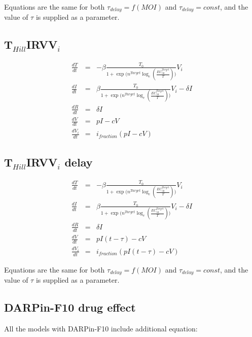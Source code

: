 Equations are the same for both $\tau_{delay} = f(MOI)$ and $\tau_{delay} = const$, and the value of $\tau$ is supplied as a parameter.

\subsection{T$_{Hill}$IRVV$_i$}

\begin{equation}
\begin{array}{rcl}
\frac{dT}{dt} &=& - \beta \frac{T_0}{1+\exp \big(n^{Target}\log_e(\frac{EC_{50}^{Target}}{T})\big)} V_i \\
\frac{dI}{dt} &=&  \beta \frac{T_0}{1+\exp \big(n^{Target}\log_e(\frac{EC_{50}^{Target}}{T})\big)} V_i - \delta I \\
\frac{dR}{dt} &=& \delta I \\
\frac{dV}{dt} &=& p I - c V\\
\frac{dV_i}{dt} &=& i_{fraction} (p I - c V)
\end{array}
\end{equation}

\subsection{T$_{Hill}$IRVV$_i$ delay}

\begin{equation}
\begin{array}{rcl}
\frac{dT}{dt} &=& - \beta \frac{T_0}{1+\exp \big(n^{Target}\log_e(\frac{EC_{50}^{Target}}{T})\big)} V_i \\
\frac{dI}{dt} &=&  \beta \frac{T_0}{1+\exp \big(n^{Target}\log_e(\frac{EC_{50}^{Target}}{T})\big)} V_i - \delta I \\
\frac{dR}{dt} &=& \delta I \\
\frac{dV}{dt} &=& p I (t - \tau) - c V\\
\frac{dV_i}{dt} &=& i_{fraction} (p I (t - \tau) - c V)
\end{array}
\end{equation}

Equations are the same for both $\tau_{delay} = f(MOI)$ and $\tau_{delay} = const$, and the value of $\tau$ is supplied as a parameter.

\subsection{DARPin-F10 drug effect}

All the models with DARPin-F10 include additional equation:


